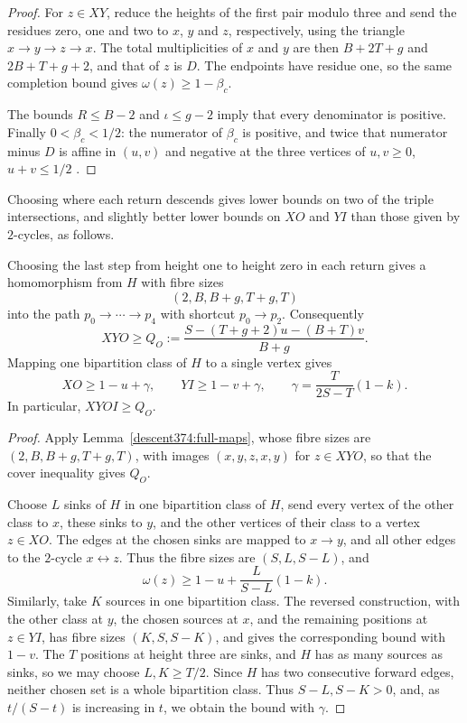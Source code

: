 \begin{proof}
For $z\in XY$, reduce the heights of the first pair modulo three and
send the residues zero, one and two to $x$, $y$ and $z$, respectively, using the triangle
$x\to y\to z\to x$. The total multiplicities of $x$ and $y$ are then
$B+2T+g$ and $2B+T+g+2$, and that of $z$ is $D$.
The endpoints have residue one, so the same completion bound
gives $\omega(z)\ge1-\beta_c$.

The bounds $R\le B-2$ and $\iota\le g-2$ imply that every denominator is positive.
Finally $0<\beta_c<1/2$: the numerator of $\beta_c$ is positive, and twice
that numerator minus $D$ is affine in $(u,v)$ and negative at the three
vertices of $u,v\ge0$, $u+v\le1/2$ .
\end{proof}

Choosing where each return descends gives lower bounds on two of the triple intersections, and slightly better lower bounds on $XO$ and $YI$ than those given by $2$-cycles, as follows.

\begin{lemma}
\label{compact390:actual-reserves}
Choosing the last step from height one to height zero in each return gives a homomorphism from $H$
with fibre sizes
\[
                     (2,B,B+g,T+g,T)
\]
into the path \(p_0\to\cdots\to p_4\) with shortcut
\(p_0\to p_2\). Consequently
\[
 XYO\ge Q_O:=
       \frac{S-(T+g+2)u-(B+T)v}{B+g}.
\]
Mapping one bipartition class of $H$ to a single vertex gives
\[
 XO\ge1-u+\gamma,\qquad YI\ge1-v+\gamma,
 \qquad \gamma=\frac{T}{2S-T}(1-k).
\]
In particular, $XYOI\ge Q_O$.
\end{lemma}
\begin{proof}
Apply Lemma~\ref{descent374:full-maps}, whose fibre sizes are
$(2,B,B+g,T+g,T)$, with images $(x,y,z,x,y)$ for $z\in XYO$,
so that the cover inequality gives $Q_O$.

Choose $L$ sinks of $H$ in one bipartition class of $H$, send every vertex
of the other class to $x$, these sinks to $y$,
and the other vertices of their class to a vertex $z\in XO$.
The edges at the chosen sinks are mapped to $x\to y$, and all other edges
to the $2$-cycle $x\leftrightarrow z$. Thus the
fibre sizes are $(S,L,S-L)$, and
\[
 \omega(z)\ge1-u+\frac{L}{S-L}(1-k).
\]
Similarly, take $K$ sources in one bipartition class. The reversed construction, with the other class at $y$, the chosen sources at $x$, and
the remaining positions at $z\in YI$, has fibre sizes
$(K,S,S-K)$, and gives the corresponding bound with $1-v$.
The $T$ positions at height three are sinks, and $H$ has as many sources as sinks,
so we may choose $L,K\ge T/2$. Since $H$ has two consecutive
forward edges, neither chosen set is a whole bipartition class.
Thus $S-L,S-K>0$, and, as $t/(S-t)$ is increasing in $t$, we obtain the bound with $\gamma$.

\end{proof}

